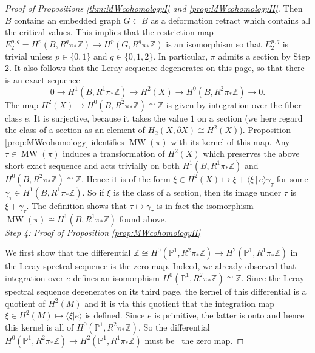 \documentclass[10pt,a4paper]{amsart}
\def\PP{{\mathbb P}}
\def\ZZ{{\mathbb Z}}
\def\g{\gamma}
\def\la{\langle}
\def\ra{\rangle}
\newcommand\MW{\operatorname{MW}}
\newcommand{\p}{\partial}
\begin{document}
\begin{proof}[Proof of  Propositions  \ref{thm:MWcohomologyI} and \ref{prop:MWcohomologyII}]
Then $B$ contains an embedded  graph $G\subset B$ as a deformation retract which  contains all the  critical values. This implies that the restriction map  $E_2^{p,q}= H^p(B, R^q\pi_*\ZZ)\to H^p(G, R^q\pi_*\ZZ)$ is an isomorphism  so that $E_2^{p,q}$ is trivial unless 
$p\in \{0,1\}$ and $q\in \{0,1,2\}$.  In particular, $\pi$  admits a section by Step 2. It also follows that  the Leray sequence degenerates on this page, so that  there is an exact sequence
\[
0\to H^1(B, R^1\pi_*\ZZ)\to H^2(X)\to H^0(B, R^2\pi_*\ZZ)\to 0.
\]
The  map $H^2(X)\to H^0(B, R^2\pi_*\ZZ)\cong \ZZ$ is given by integration over the fiber class $e$. It is 
surjective, because it takes the value $1$ on a section (we here regard the class of a section as an element of 
$H_2(X, \p X)\cong H^2(X)$). Proposition \ref{prop:MWcohomology}  identifies  $\MW(\pi)$ with its kernel of 
this map.  Any  $\tau\in \MW(\pi)$ induces a transformation of $H^2(X)$ which preserves the above short 
exact sequence  and acts trivially on both $H^1(B, R^1\pi_*\ZZ)$ and $H^0(B, R^2\pi_*\ZZ)\cong\ZZ$. 
Hence it is of the form $\xi\in H^2(X)\mapsto \xi +\la \xi\, |\, e\ra \g_\tau$ for some 
$\g_\tau\in H^1(B, R^1\pi_*\ZZ)$. So if  $\xi$ is the class  of a section, then its image under $\tau$ is $\xi+\g_\tau$. 
The definition shows that $\tau\mapsto \g_\tau$ is in fact the isomorphism 
$\MW(\pi)\cong H^1(B, R^1\pi_*\ZZ)$ found above.
\\

\emph{Step 4: Proof  of  Proposition \ref{prop:MWcohomologyII}}

We first show that the differential $\ZZ\cong H^0(\PP^1, R^2\pi_*\ZZ)\to H^2(\PP^1, R^1\pi_*\ZZ)$ in the Leray 
spectral sequence is the zero map. Indeed, we already observed that integration over $e$ defines 
an isomorphism $H^0(\PP^1, R^2\pi_*\ZZ)\cong \ZZ$.
Since the Leray spectral sequence degenerates on its third page, the kernel of this differential is  a 
quotient of $H^2(M)$ and it is via this quotient that the integration map 
$\xi\in H^2(M)\mapsto \la\xi | e\ra$ is defined. Since $e$ is primitive, the latter is onto and hence this kernel 
is all of  $H^0(\PP^1, R^2\pi_*\ZZ)$. So the differential $H^0(\PP^1, R^2\pi_*\ZZ)\to H^2(\PP^1, R^1\pi_*\ZZ)$ must be \
the zero map. 


\end{proof}
\end{document}

